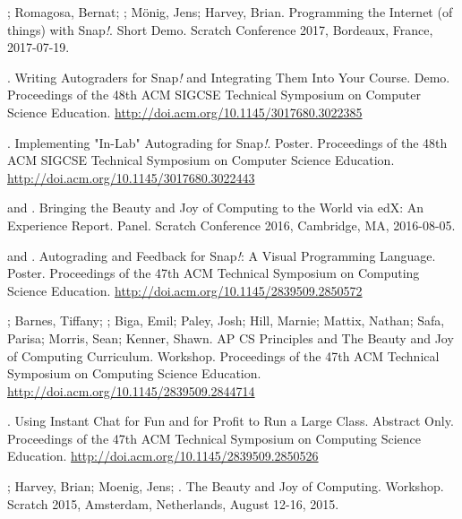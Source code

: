 \begin{etaremune}
    \item{\dan; Romagosa, Bernat; \me; Mönig, Jens; Harvey, Brian. Programming the Internet (of things) with Snap\textit{!}. Short Demo. Scratch Conference 2017, Bordeaux, France, 2017-07-19.}

    \item{\me. Writing Autograders for Snap\textit{!} and Integrating Them Into Your Course. Demo. Proceedings of the 48th ACM SIGCSE Technical Symposium on Computer Science Education.} \href{http://doi.acm.org/10.1145/3017680.3022385}{http://doi.acm.org/10.1145/3017680.3022385}

    \item{\me. Implementing "In-Lab" Autograding for Snap\textit{!}. Poster. Proceedings of the 48th ACM SIGCSE Technical Symposium on Computer Science Education.} \newline\href{http://doi.acm.org/10.1145/3017680.3022443}{http://doi.acm.org/10.1145/3017680.3022443}
    

    \item{\dan and \me. Bringing the Beauty and Joy of Computing to the World via edX: An Experience Report. Panel. Scratch Conference 2016, Cambridge, MA, 2016-08-05.}

    \item{\me and \dan. Autograding and Feedback for Snap\textit{!}: A Visual Programming Language. Poster. Proceedings of the 47th ACM Technical Symposium on Computing Science Education.}
    \href{http://doi.acm.org/10.1145/2839509.2850572}{http://doi.acm.org/10.1145/2839509.2850572}

    \item{\dan; Barnes, Tiffany; \me; Biga, Emil; Paley, Josh; Hill, Marnie; Mattix, Nathan; Safa, Parisa; Morris, Sean; Kenner, Shawn. AP CS Principles and The Beauty and Joy of Computing Curriculum. Workshop. Proceedings of the 47th ACM Technical Symposium on Computing Science Education.} \href{http://doi.acm.org/10.1145/2839509.2844714}{http://doi.acm.org/10.1145/2839509.2844714}

    \item{\me. Using Instant Chat for Fun and for Profit to Run a Large Class. Abstract Only. Proceedings of the 47th ACM Technical Symposium on Computing Science Education.} \href{http://doi.acm.org/10.1145/2839509.2850526}{http://doi.acm.org/10.1145/2839509.2850526}
    

    \item{\dan; Harvey, Brian; Moenig, Jens; \me. The Beauty and Joy of Computing. Workshop. Scratch 2015, Amsterdam, Netherlands, August 12-16, 2015.}


\end{etaremune}
